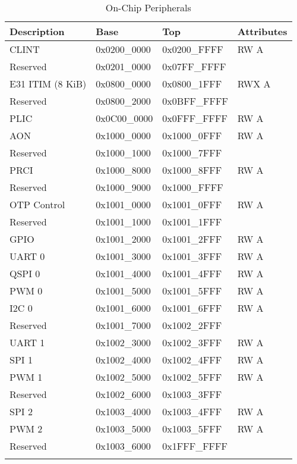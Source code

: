 \documentclass[a4paper,12pt,twoside]{report}
\begin{document}
                \begin{longtable}[H]{| p{4.5cm} | p{3cm} | p{3cm} | p{2.5cm} |}
               		\hline
               		\textbf{Description} & \textbf{Base} & \textbf{Top} & \textbf{Attributes}\\
               		\hline
               		\hline
               		\endfirsthead
               		CLINT & 0x0200\_0000 & 0x0200\_FFFF & RW
A\\
               		Reserved & 0x0201\_0000 & 0x07FF\_FFFF & \\
               		E31 ITIM (8 KiB) & 0x0800\_0000 & 0x0800\_1FFF & RWX A\\
               		Reserved & 0x0800\_2000 & 0x0BFF\_FFFF & \\
               		PLIC & 0x0C00\_0000 & 0x0FFF\_FFFF & RW A\\
               		AON & 0x1000\_0000 & 0x1000\_0FFF & RW A\\
               		Reserved & 0x1000\_1000 & 0x1000\_7FFF & \\
               		PRCI & 0x1000\_8000 & 0x1000\_8FFF & RW A\\
               		Reserved & 0x1000\_9000 & 0x1000\_FFFF & \\
               		OTP Control & 0x1001\_0000 & 0x1001\_0FFF & RW A\\
               		Reserved & 0x1001\_1000 & 0x1001\_1FFF & \\
               		GPIO & 0x1001\_2000 & 0x1001\_2FFF & RW A\\
               		UART 0 & 0x1001\_3000 & 0x1001\_3FFF & RW A\\
               		QSPI 0 & 0x1001\_4000 & 0x1001\_4FFF & RW A\\
               		PWM 0 & 0x1001\_5000 & 0x1001\_5FFF & RW A\\
               		I2C 0 & 0x1001\_6000 & 0x1001\_6FFF & RW A\\
               		Reserved & 0x1001\_7000 & 0x1002\_2FFF & \\
               		UART 1 & 0x1002\_3000 & 0x1002\_3FFF & RW A\\
               		SPI 1 & 0x1002\_4000 & 0x1002\_4FFF & RW A\\
               		PWM 1 & 0x1002\_5000 & 0x1002\_5FFF & RW A\\
               		Reserved & 0x1002\_6000 & 0x1003\_3FFF & \\
               		SPI 2 & 0x1003\_4000 & 0x1003\_4FFF & RW A\\
               		PWM 2 & 0x1003\_5000 & 0x1003\_5FFF & RW A\\
               		Reserved & 0x1003\_6000 & 0x1FFF\_FFFF & \\
               		\hline
               		\caption{On-Chip Peripherals}
                \end{longtable}
            
\end{document}
